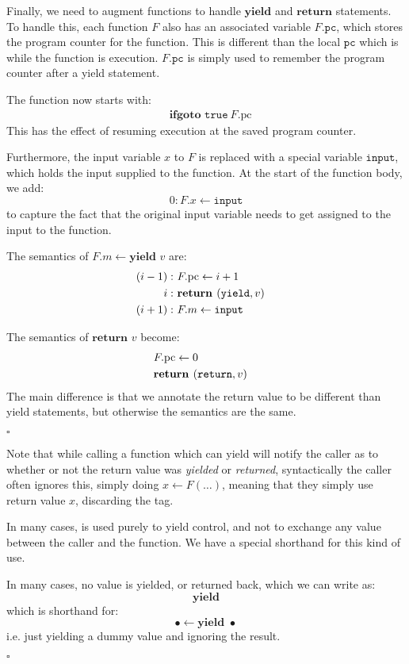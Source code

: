 \begin{definition}
Finally, we need to augment functions to handle $\textbf{yield}$ and $\textbf{return}$
statements.
To handle this, each function $F$ also has an associated variable
$F.\texttt{pc}$, which stores the program counter for the function.
This is different than the local $\texttt{pc}$ which is while the function is
execution.
$F.\texttt{pc}$ is simply used to remember the program counter after a yield
statement.

The function now starts with:
$$
\begin{aligned}
&\textbf{ifgoto } \texttt{true}\ F.\text{pc} 
\end{aligned}
$$
This has the effect of resuming execution at the saved program counter.

Furthermore, the input variable $x$ to $F$ is replaced with a special
variable $\texttt{input}$, which holds the input supplied to the function.
At the start of the function body, we add:
$$
0: F.x \gets \texttt{input}
$$
to capture the fact that the original input variable needs to get assigned
to the input to the function.

The semantics of $F.m \gets \textbf{yield } v$ are:
$$
\begin{aligned}
(i-1):&\ F.\text{pc} \gets i + 1\cr
i:&\ \textbf{return } (\texttt{yield}, v)\cr
(i + 1):&\ F.m \gets \texttt{input}
\end{aligned}
$$

The semantics of $\textbf{return } v$ become:
$$
\begin{aligned}
&F.\text{pc} \gets 0\cr
&\textbf{return } (\texttt{return}, v)
\end{aligned}
$$
The main difference is that we annotate the return value to be different than
yield statements, but otherwise the semantics are the same.

$\square$
\end{definition}

Note that while calling a function which can yield will notify the
caller as to whether or not the return value was \emph{yielded}
or \emph{returned}, syntactically the caller often ignores this,
simply doing $x \gets F(\ldots)$, meaning that they simply use
return value $x$, discarding the tag.

In many cases,  is used purely to yield control,
and not to exchange any value between the caller and the function.
We have a special shorthand for this kind of use.

\begin{syntax}
In many cases, no value is yielded, or returned back, which we can write as:
$$
\textbf{yield}
$$
which is shorthand for:
$$
\bullet \gets \textbf{yield } \bullet
$$
i.e. just yielding a dummy value and ignoring the result.

$\square$
\end{syntax}

